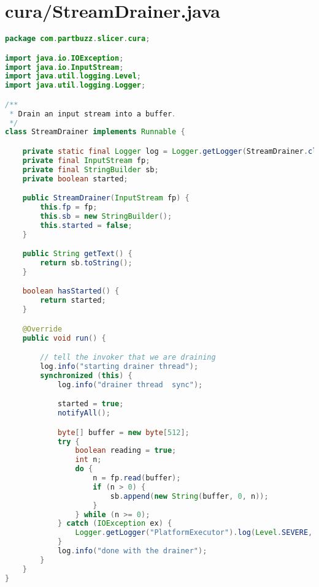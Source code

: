 \section{cura/StreamDrainer.java}
\begin{lstlisting}[language=Java, label={lst:StreamDrainer}, caption=For ProcessBuilder to run correctly its output stream must be read from. This code spawns a separate thread to read and log this output stream.]
package com.partbuzz.slicer.cura;

import java.io.IOException;
import java.io.InputStream;
import java.util.logging.Level;
import java.util.logging.Logger;

/**
 * Drain an input stream into a buffer.
 */
class StreamDrainer implements Runnable {

    private static final Logger log = Logger.getLogger(StreamDrainer.class.getName());
    private final InputStream fp;
    private final StringBuilder sb;
    private boolean started;

    public StreamDrainer(InputStream fp) {
        this.fp = fp;
        this.sb = new StringBuilder();
        this.started = false;
    }

    public String getText() {
        return sb.toString();
    }

    boolean hasStarted() {
        return started;
    }

    @Override
    public void run() {

        // tell the invoker that we are draining
        log.info("starting drainer thread");
        synchronized (this) {
            log.info("drainer thread  sync");

            started = true;
            notifyAll();

            byte[] buffer = new byte[512];
            try {
                boolean reading = true;
                int n;
                do {
                    n = fp.read(buffer);
                    if (n > 0) {
                        sb.append(new String(buffer, 0, n));
                    }
                } while (n >= 0);
            } catch (IOException ex) {
                Logger.getLogger("PlatformExecutor").log(Level.SEVERE, null, ex);
            }
            log.info("done with the drainer");
        }
    }
}
\end{lstlisting}


